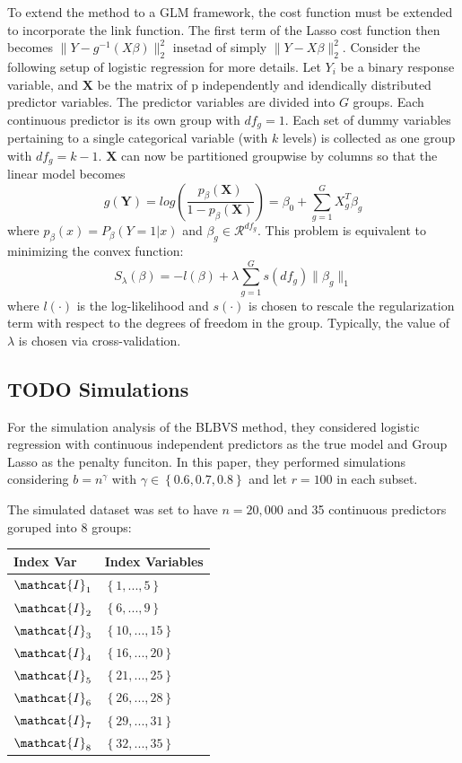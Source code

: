 \documentclass[11pt]{article}
\begin{document}
To extend the method to a GLM framework, the cost function must be extended to incorporate the link function. The first term of the Lasso cost function then becomes \(\| Y - g^{-1}(X\beta) \|^2_2\) insetad of simply \(\| Y - X\beta \|^2_2\). Consider the following setup of logistic regression for more details. Let \(Y_i\) be a binary response variable, and \(\mathbf{X}\) be the matrix of p independently and idendically distributed predictor variables. The predictor variables are divided into \(G\) groups. Each continuous predictor is its own group with \(df_g = 1\). Each set of dummy variables pertaining to a single categorical variable (with \(k\) levels) is collected as one group with \(df_g = k - 1\). \(\mathbf{X}\) can now be partitioned groupwise by columns so that the linear model becomes $$g(\mathbf{Y}) = log \left( \frac{p_\beta(\mathbf{X})}{1 - p_\beta (\mathbf{X})} \right) = \beta_0 + \sum^G_{g=1} X^T_g \beta_g $$ where \(p_\beta(x) = P_\beta(Y = 1 | x)\) and \(\beta_g \in \mathcal{R}^{df_g}\). This problem is equivalent to minimizing the convex function: $$S_\lambda(\beta) = -l(\beta) + \lambda \sum^G_{g=1} s(df_g) \|\beta_g \|_1$$ where \(l(\cdot)\) is the log-likelihood and \(s(\cdot)\) is chosen to rescale the regularization term with respect to the degrees of freedom in the group. Typically, the value of \(\lambda\) is chosen via cross-validation.

\subsection{{\bfseries\sffamily TODO} Simulations}
\label{sec:org4011891}

For the simulation analysis of the BLBVS method, they considered logistic regression with continuous independent predictors as the true model and Group Lasso as the penalty funciton. In this paper, they performed simulations considering \(b = n^\gamma\) with \(\gamma \in \left\{ 0.6, 0.7, 0.8 \right\}\) and let \(r = 100\) in each subset.

The simulated dataset was set to have \(n = 20,000\) and 35 continuous predictors goruped into 8 groups:

\begin{center}
\begin{tabular}{ll}
Index Var & Index Variables\\
\hline
\(\mathcat{I}_1\) & \(\left\{ 1, ..., 5 \right\}\)\\
\(\mathcat{I}_2\) & \(\left\{ 6, ..., 9 \right\}\)\\
\(\mathcat{I}_3\) & \(\left\{ 10, ..., 15 \right\}\)\\
\(\mathcat{I}_4\) & \(\left\{ 16, ..., 20 \right\}\)\\
\(\mathcat{I}_5\) & \(\left\{ 21, ..., 25 \right\}\)\\
\(\mathcat{I}_6\) & \(\left\{ 26, ..., 28 \right\}\)\\
\(\mathcat{I}_7\) & \(\left\{ 29, ..., 31 \right\}\)\\
\(\mathcat{I}_8\) & \(\left\{ 32, ..., 35 \right\}\)\\
\end{tabular}
\end{center}
\end{document}
